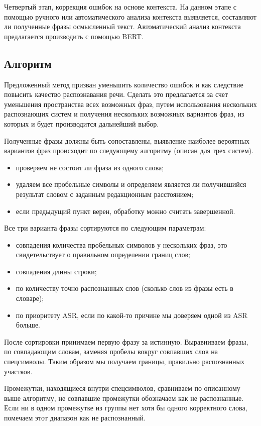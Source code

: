 \documentclass[conference]{IEEEtran}
\begin{document}
Четвертый этап, коррекция ошибок на основе контекста. На данном этапе с помощью ручного или автоматического анализа контекста выявляется, составляют ли полученные фразы осмысленный текст. Автоматический анализ контекста предлагается производить с помощью BERT.

\subsection{Алгоритм}
Предложенный метод призван уменьшить количество ошибок и как следствие повысить качество распознавания речи. Сделать это предлагается за счет уменьшения пространства всех возможных фраз, путем использования нескольких распознающих систем и получения нескольких возможных вариантов фраз, из которых и будет производится дальнейший выбор.

Полученные фразы должны быть сопоставлены, выявление наиболее вероятных вариантов фраз происходит по следующему алгоритму (описан для трех систем).

\begin{itemize}
\item проверяем не состоит ли фраза из одного слова;
\item удаляем все пробельные символы и определяем является ли получившийся результат словом с заданным редакционным расстоянием;
\item если предыдущий пункт верен, обработку можно считать завершенной.
\end{itemize}

Все три варианта фразы сортируются по следующим параметрам:

\begin{itemize}
\item совпадения количества пробельных символов у нескольких фраз, это свидетельствует о правильном определении границ слов;
\item совпадения длины строки;
\item по количеству точно распознанных слов (сколько слов из фразы есть в словаре);
\item по приоритету ASR, если по какой-то причине мы доверяем одной из ASR больше.
\end{itemize}

После сортировки принимаем первую фразу за истинную. Выравниваем фразы, по совпадающим словам, заменяя пробелы вокруг совпавших слов на спецсимволы. Таким образом мы получаем границы, правильно распознанных участков.

Промежутки, находящиеся внутри спецсимволов, сравниваем по описанному выше алгоритму, не совпавшие промежутки обозначаем как не распознанные. Если ни в одном промежутке из группы нет хотя бы одного корректного слова, помечаем этот диапазон как не распознанный.
\end{document}
